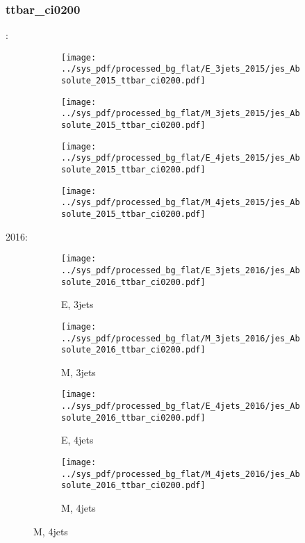 \documentclass{beamer}
\begin{document}
\begin{frame}
\frametitle{ttbar_ci0200}
\fontsize{5}{1}:
\begin{figure}
\centering
\begin{subfigure}[b]{0.24\textwidth}
\texttt{[image: ../sys\_pdf/processed\_bg\_flat/E\_3jets\_2015/jes\_Absolute\_2015\_ttbar\_ci0200.pdf]}
\end{subfigure}
\begin{subfigure}[b]{0.24\textwidth}
\texttt{[image: ../sys\_pdf/processed\_bg\_flat/M\_3jets\_2015/jes\_Absolute\_2015\_ttbar\_ci0200.pdf]}
\end{subfigure}
\begin{subfigure}[b]{0.24\textwidth}
\texttt{[image: ../sys\_pdf/processed\_bg\_flat/E\_4jets\_2015/jes\_Absolute\_2015\_ttbar\_ci0200.pdf]}
\end{subfigure}
\begin{subfigure}[b]{0.24\textwidth}
\texttt{[image: ../sys\_pdf/processed\_bg\_flat/M\_4jets\_2015/jes\_Absolute\_2015\_ttbar\_ci0200.pdf]}
\end{subfigure}
\end{figure}
2016:
\begin{figure}
\centering
\begin{subfigure}[b]{0.24\textwidth}
\texttt{[image: ../sys\_pdf/processed\_bg\_flat/E\_3jets\_2016/jes\_Absolute\_2016\_ttbar\_ci0200.pdf]}
\captionsetup{font=tiny}
\caption{E, 3jets}
\end{subfigure}
\begin{subfigure}[b]{0.24\textwidth}
\texttt{[image: ../sys\_pdf/processed\_bg\_flat/M\_3jets\_2016/jes\_Absolute\_2016\_ttbar\_ci0200.pdf]}
\captionsetup{font=tiny}
\caption{M, 3jets}
\end{subfigure}
\begin{subfigure}[b]{0.24\textwidth}
\texttt{[image: ../sys\_pdf/processed\_bg\_flat/E\_4jets\_2016/jes\_Absolute\_2016\_ttbar\_ci0200.pdf]}
\captionsetup{font=tiny}
\caption{E, 4jets}
\end{subfigure}
\begin{subfigure}[b]{0.24\textwidth}
\texttt{[image: ../sys\_pdf/processed\_bg\_flat/M\_4jets\_2016/jes\_Absolute\_2016\_ttbar\_ci0200.pdf]}
\captionsetup{font=tiny}
\caption{M, 4jets}
\end{subfigure}
\end{figure}
\end{frame}
\end{document}
